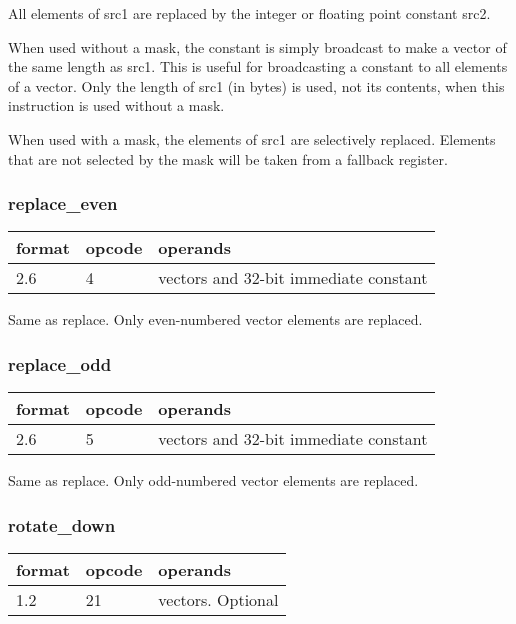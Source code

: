 \documentclass[forwardcom.tex]{subfiles}
\begin{document}
All elements of src1 are replaced by the integer or floating point constant src2.
\vspace{2mm}

When used without a mask, the constant is simply broadcast to make a vector of the same length as src1. This is useful for broadcasting a constant to all elements of a vector. Only the length of src1 (in bytes) is used, not its contents, when this instruction is used without a mask.
\vspace{2mm}

When used with a mask, the elements of src1 are selectively replaced. Elements that are not selected by the mask will be taken from a fallback register.


\subsubsection{replace\_even}
\label{table:replaceEvenInstruction}
\begin{tabular}{|p{12mm}|p{12mm}|p{110mm}|}
\hline
\bfseries format & \bfseries opcode & \bfseries operands \\ \hline
2.6 & 4 & vectors and 32-bit immediate constant \\ \hline
\end{tabular}
\vspace{2mm}

Same as replace. Only even-numbered vector elements are replaced.

\subsubsection{replace\_odd}
\label{table:replaceOddInstruction}
\begin{tabular}{|p{12mm}|p{12mm}|p{110mm}|}
\hline
\bfseries format & \bfseries opcode & \bfseries operands \\ \hline
2.6 & 5 & vectors and 32-bit immediate constant \\ \hline
\end{tabular}
\vspace{2mm}

Same as replace. Only odd-numbered vector elements are replaced.

\subsubsection{rotate\_down}
\label{table:rotateDownInstruction}
\begin{tabular}{|p{12mm}|p{12mm}|p{110mm}|}
\hline
\bfseries format & \bfseries opcode & \bfseries operands \\ \hline
1.2 & 21 & vectors. Optional \\ \hline
\end{tabular}
\vspace{2mm}
\end{document}
